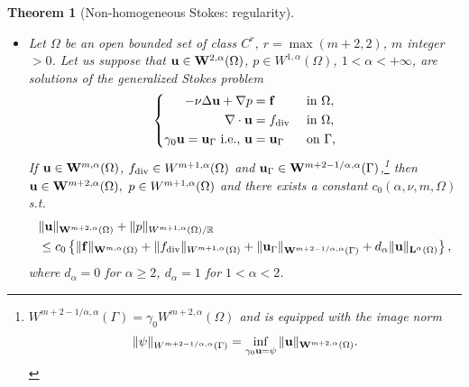 \documentclass[oneside,11pt]{book}
\numberwithin{equation}{section}
\newtheorem{theorem}{Theorem}[section]
\begin{document}
\begin{theorem}[Non-homogeneous Stokes: regularity]
    \begin{itemize}
        \item[(i)] Let $\Omega$ be an open bounded set of class $C^r$, $r = \max(m + 2,2)$, $m$ integer $> 0$. Let us suppose that ${\bf u}\in{\bf W}^{2,\alpha}(\Omega)$, $p\in W^{1,\alpha}(\Omega)$, $1 < \alpha < +\infty$, are solutions of the generalized Stokes problem
        \begin{equation*}
            \left\{\begin{split}
                -\nu\Delta{\bf u} + \nabla p &= {\bf f} &&\mbox{ in } \Omega,\\
                \nabla\cdot{\bf u} &= f_{\rm div} &&\mbox{ in } \Omega,\\
                \gamma_0{\bf u} = {\bf u}_\Gamma \mbox{ i.e., } {\bf u} &= {\bf u}_\Gamma &&\mbox{ on } \Gamma,
            \end{split}\right.
        \end{equation*}
        If ${\bf u}\in{\bf W}^{m,\alpha}(\Omega)$, $f_{\rm div}\in W^{m+1,\alpha}(\Omega)$ and ${\bf u}_\Gamma\in{\bf W}^{m + 2 - 1/\alpha,\alpha}(\Gamma)$,\footnote{$W^{m + 2 - 1/\alpha,\alpha}(\Gamma) = \gamma_0W^{m+2,\alpha}(\Omega)$ and is equipped with the image norm
            \begin{align*}
                \|\psi\|_{W^{m + 2 - 1/\alpha,\alpha}(\Gamma)} = \inf_{\gamma_0{\bf u} = \psi} \|{\bf u}\|_{{\bf W}^{m+2,\alpha}(\Omega)}.
        \end{align*}} then ${\bf u}\in{\bf W}^{m+2,\alpha}(\Omega),\ p\in W^{m+1,\alpha}(\Omega)$ and there exists a constant $c_0(\alpha,\nu,m,\Omega)$ s.t.
        \begin{align}
            \label{Temam2000 (2.46)}
            &\|{\bf u}\|_{{\bf W}^{m+2,\alpha}(\Omega)} + \|p\|_{W^{m+1,\alpha}(\Omega)/\mathbb{R}}\nonumber\\
            &\le c_0\left\{\|{\bf f}\|_{{\bf W}^{m,\alpha}(\Omega)} + \|f_{\rm div}\|_{W^{m+1,\alpha}(\Omega)} + \|{\bf u}_\Gamma\|_{{\bf W}^{m + 2 - 1/\alpha,\alpha}(\Gamma)} + d_\alpha\|{\bf u}\|_{{\bf L}^\alpha(\Omega)}\right\},
        \end{align}
        where $d_\alpha = 0$ for $\alpha\ge 2$, $d_\alpha = 1$ for $1 < \alpha < 2$.
    \end{itemize}
\end{theorem}
\end{document}
